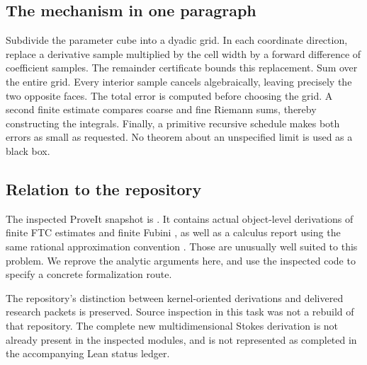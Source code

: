 \subsection{The mechanism in one paragraph}

Subdivide the parameter cube into a dyadic grid. In each coordinate direction,
replace a derivative sample multiplied by the cell width by a forward
difference of coefficient samples. The remainder certificate bounds this
replacement. Sum over the entire grid. Every interior sample cancels
algebraically, leaving precisely the two opposite faces. The total error is
computed before choosing the grid. A second finite estimate compares coarse
and fine Riemann sums, thereby constructing the integrals. Finally, a
primitive recursive schedule makes both errors as small as requested.
No theorem about an unspecified limit is used as a black box.

\subsection{Relation to the repository}

The inspected ProveIt snapshot is \RepoCommit. It contains actual
object-level derivations of finite FTC estimates and finite Fubini
\cite{repo-ftc,repo-fubini}, as well as a calculus report using the same
rational approximation convention \cite{repo-calculus}. Those are unusually
well suited to this problem. We reprove the analytic arguments here, and use
the inspected code to specify a concrete formalization route.

The repository's distinction between kernel-oriented derivations and
delivered research packets is preserved. Source inspection in this task was
not a rebuild of that repository. The complete new multidimensional Stokes
derivation is not already present in the inspected modules, and is not
represented as completed in the accompanying Lean status ledger.
